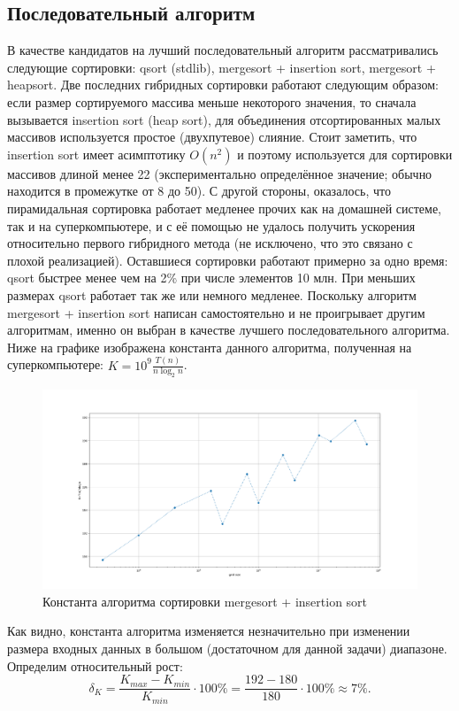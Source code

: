\documentclass[14pt]{extarticle}
\begin{document}
\subsection{Последовательный алгоритм}
В качестве кандидатов на лучший последовательный алгоритм рассматривались следующие сортировки: qsort (stdlib), mergesort + insertion sort, mergesort + heapsort. Две последних гибридных сортировки работают следующим образом: если размер сортируемого массива меньше некоторого значения, то сначала вызывается insertion sort (heap sort), для объединения отсортированных малых массивов используется простое (двухпутевое) слияние. Стоит заметить, что insertion sort имеет асимптотику $O(n^2)$ и поэтому используется для сортировки массивов длиной менее 22 (экспериментально определённое значение; обычно находится в промежутке от 8 до 50). С другой стороны, оказалось, что пирамидальная сортировка работает медленее прочих как на домашней системе, так и на суперкомпьютере, и с её помощью не удалось получить ускорения относительно первого гибридного метода (не исключено, что это связано с плохой реализацией). Оставшиеся сортировки работают примерно за одно время: qsort быстрее менее чем на 2\% при числе элементов 10 млн. При меньших размерах qsort работает так же или немного медленее. Поскольку алгоритм mergesort + insertion sort написан самостоятельно и не проигрывает другим алгоритмам, именно он выбран в качестве лучшего последовательного алгоритма. Ниже на графике изображена константа данного алгоритма, полученная на суперкомпьютере: $ K = 10^9 \frac{T(n)}{n \log_2 n} $.
\begin{figure}[H]
	\centering
	\includegraphics[scale=0.4]{constant}
	\caption{Константа алгоритма сортировки mergesort + insertion sort}
\end{figure}

Как видно, константа алгоритма изменяется незначительно при изменении размера входных данных в большом (достаточном для данной задачи) диапазоне. Определим относительный рост:
\begin{equation*}
\delta_K = \frac{K_{max}-K_{min}}{K_{min}} \cdot 100 \% = \frac{192-180}{180} \cdot 100 \% \approx 7 \%.
\end{equation*}
\end{document}
